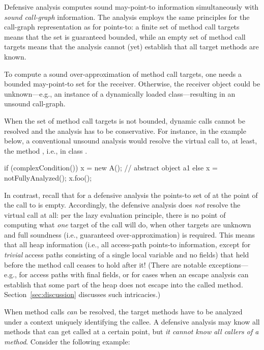 Defensive analysis computes sound may-point-to information simultaneously
with \emph{sound call-graph} information. The analysis employs the
same principles for the call-graph representation as for points-to:
a finite set of method call targets means that the set is guaranteed
bounded, while an empty set of method call targets means that the
analysis cannot (yet) establish that all target methods are known.

To compute a sound over-approximation of method call targets, one
needs a bounded may-point-to set for the receiver. Otherwise, the
receiver object could be unknown---e.g., an instance of a dynamically
loaded class---resulting in an unsound call-graph.

When the set of method call targets is not bounded, dynamic calls
cannot be resolved and the analysis has to be conservative. For
instance, in the example below, a conventional unsound analysis would
resolve the virtual call  to, at least, the method
, i.e.,  in class .

\vspace{-3mm}\begin{minipage}[l]{5.1in}
\begin{javacode}
if (complexCondition()) {
  x = new A();  // abstract object a1
} else {
  x = notFullyAnalyzed();
}
x.foo();
\end{javacode}
\end{minipage}

In contrast, recall that for a defensive analysis the points-to set of
 at the point of the call to  is empty. Accordingly, the
defensive analysis does \emph{not} resolve the virtual call at
all: per the lazy evaluation principle, there is no point of computing what \emph{one} target of the call will
do, when other targets are unknown and full soundness (i.e., guaranteed over-approximation) is required.
This means that all heap information (i.e., all access-path
points-to information, except for \emph{trivial} access paths
consisting of a single local variable and no fields) that held before
the method call ceases to hold after it! (There are notable
  exceptions---e.g., for access paths with final
  fields, or for cases when an escape analysis can establish that some
  part of the heap does not escape into the called
  method. Section~\ref{sec:discussion} discusses such intricacies.)

When method calls \emph{can} be resolved, the target methods have to
be analyzed under a context uniquely identifying the callee. A
defensive analysis may know all methods that can get called at a
certain point, but \emph{it cannot know all callers of a
  method}. Consider the following example:

